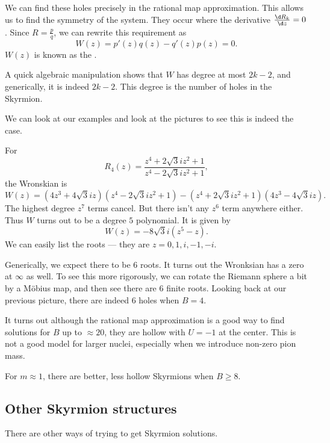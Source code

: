 \documentclass[a4paper]{article}
\begin{document}
We can find these holes precisely in the rational map approximation. This allows us to find the symmetry of the system. They occur where the derivative $\frac{\d R_k}{\d z} = 0$. Since $R = \frac{p}{q}$, we can rewrite this requirement as
\[
  W(z) = p'(z) q(z) - q'(z) p(z) = 0.
\]
$W(z)$ is known as the .

A quick algebraic manipulation shows that $W$ has degree at most $2k - 2$, and generically, it is indeed $2k - 2$. This degree is the number of holes in the Skyrmion.

We can look at our examples and look at the pictures to see this is indeed the case.

\begin{eg}
  For
  \[
    R_4(z) = \frac{z^4 + 2\sqrt{3} i z^2 + 1}{z^4 - 2\sqrt{3} i z^2 + 1},
  \]
  the Wronskian is
  \[
    W(z) = (4z^3 + 4 \sqrt{3}i z)(z^4 - 2\sqrt{3} i z^2 + 1) - (z^4 + 2 \sqrt{3} i z^2 + 1) (4z^3 - 4 \sqrt{3} i z).
  \]
  The highest degree $z^7$ terms cancel. But there isn't any $z^6$ term anywhere either. Thus $W$ turns out to be a degree $5$ polynomial. It is given by
  \[
    W(z) = - 8 \sqrt{3}i (z^5 - z).
  \]
  We can easily list the roots --- they are $z = 0, 1, i, -1, -i$.

  Generically, we expect there to be $6$ roots. It turns out the Wronksian has a zero at $\infty$ as well. To see this more rigorously, we can rotate the Riemann sphere a bit by a M\"obius map, and then see there are $6$ finite roots. Looking back at our previous picture, there are indeed $6$ holes when $B = 4$.
\end{eg}



It turns out although the rational map approximation is a good way to find solutions for $B$ up to $\approx 20$, they are hollow with $U = -1$ at the center. This is not a good model for larger nuclei, especially when we introduce non-zero pion mass.

For $m \approx 1$, there are better, less hollow Skyrmions when $B \geq 8$.

\subsection{Other Skyrmion structures}
There are other ways of trying to get Skyrmion solutions.
\end{document}
